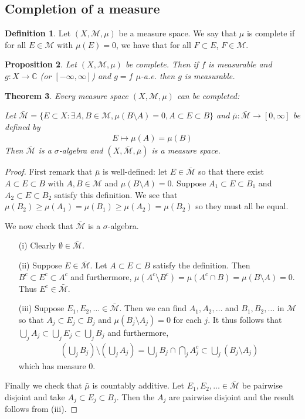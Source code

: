 \documentclass[11pt]{amsart}
\newtheorem{theorem}{Theorem}[section]
\newtheorem{proposition}[theorem]{Proposition}
\theoremstyle{definition}
\newtheorem{definition}[theorem]{Definition}
\numberwithin{equation}{section}
\begin{document}
\subsection{Completion of a measure}
\begin{definition}
    Let $(X,\mathcal M,\mu)$ be a measure space. We say that $\mu$ is complete if for all $E\in\mathcal M$ with $\mu(E)=0$, we have that for all $F\subset E$, $F\in\mathcal M$.
\end{definition}
\begin{proposition}
    Let $(X,\mathcal M,\mu)$ be complete. Then if $f$ is measurable and $g:X\to\mathbb C$ (or $[-\infty,\infty]$) and $g=f$ $\mu$-a.e. then $g$ is measurable.
\end{proposition}
\begin{theorem}
    Every measure space $(X,\mathcal M,\mu)$ can be completed:

    Let $\bar{\mathcal M}=\{E\subset X:\exists A,B\in\mathcal M,\mu(B\setminus A)=0,A\subset E\subset B\}$ and $\bar\mu:\bar{\mathcal M}\to[0,\infty]$ be defined by
    \begin{align*}
        E\mapsto\mu(A)=\mu(B)
    \end{align*}
    Then $\bar{\mathcal M}$ is a $\sigma$-algebra and $(X,\bar{\mathcal M},\bar\mu)$ is a measure space.
\end{theorem}
\begin{proof}
    First remark that $\bar\mu$ is well-defined: let $E\in\bar{\mathcal M}$ so that there exist $A\subset E\subset B$ with $A,B\in\mathcal M$ and $\mu(B\setminus A)=0$. Suppose $A_1\subset E\subset B_1$ and $A_2\subset E\subset B_2$ satisfy this definition. We see that $\mu(B_2)\ge\mu(A_1)=\mu(B_1)\ge\mu(A_2)=\mu(B_2)$ so they must all be equal.

    We now check that $\bar{\mathcal M}$ is a $\sigma$-algebra.
    \begin{enumerate}
        \item [(i)] Clearly $\emptyset\in\bar{\mathcal M}$.
        \item [(ii)] Suppose $E\in\bar{\mathcal M}$. Let $A\subset E\subset B$ satisfy the definition. Then $B^c\subset E^c\subset A^c$ and furthermore, $\mu(A^c\setminus B^c)=\mu(A^c\cap B)=\mu(B\setminus A)=0$. Thus $E^c\in \bar{\mathcal M}$.
        \item [(iii)] Suppose $E_1,E_2,\ldots\in\bar{\mathcal M}$. Then we can find $A_1,A_2,\ldots$ and $B_1,B_2,\ldots$ in $\mathcal M$ so that $A_j\subset E_j\subset B_j$ and $\mu(B_j\setminus A_j)=0$ for each $j$. It thus follows that $\bigcup_jA_j\subset\bigcup_jE_j\subset\bigcup_jB_j$ and furthermore,
        \begin{align*}
            \left(\bigcup_{j}B_j\right)\setminus\left(\bigcup_jA_j\right)=\bigcup_jB_j\cap\bigcap_jA_j^c\subset\bigcup_j(B_j\setminus A_j)
        \end{align*}
        which has measure 0.
    \end{enumerate}
    Finally we check that $\bar\mu$ is countably additive. Let $E_1,E_2,\ldots\in\bar{\mathcal M}$ be pairwise disjoint and take $A_j\subset E_j\subset B_j$. Then the $A_j$ are pairwise disjoint and the result follows from (iii).
\end{proof}
\end{document}
